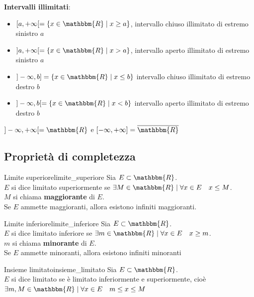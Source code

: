 \documentclass[12pt]{report}
\newcounter{definition}
\newcommand{\nmu}{}
\begin{document}
	\textbf{Intervalli illimitati}:
	\begin{itemize}
		\item $[a, +\infty[ = \{x \in \mathbbm{R} \mid x \geq a\}$, intervallo chiuso illimitato di estremo sinistro $a$
		\item $]a, +\infty[= \{x \in \mathbbm{R} \mid x > a\}$, intervallo aperto illimitato di estremo sinistro $a$
		\item $]-\infty, b] = \{x \in \mathbbm{R} \mid x \leq b\}$ intervallo chiuso illimitato di estremo destro $b$
		\item $]-\infty, b[ = \{x \in \mathbbm{R} \mid x < b\}$ intervallo aperto illimitato di estremo destro $b$
	\end{itemize}
	\begin{note}{}{}
		$]-\infty, +\infty[ = \mathbbm{R}$ e $[-\infty, +\infty] = \overline{\mathbbm{R}}$
	\end{note}
	\subsection{Proprietà di completezza}
	\begin{definition}{\nmu Limite superiore}{limite_superiore}
		Sia $E \subset \mathbbm{R}$. \\
		$E$ si dice limitato superiormente se $\exists M \in \mathbbm{R} \mid \forall x \in E \quad x \leq M$. \\
		$M$ si chiama \textbf{maggiorante} di $E$. \\
		Se $E$ ammette maggioranti, allora esistono infiniti maggioranti.
	\end{definition}
	\begin{definition}{\nmu Limite inferiore}{limite_inferiore}
		Sia $E \subset \mathbbm{R}$. \\
		$E$ si dice limitato inferiore se $\exists m \in \mathbbm{R} \mid \forall x \in E \quad x \geq m$. \\
		$m$ si chiama \textbf{minorante} di $E$. \\
		Se $E$ ammette minoranti, allora esistono infiniti minoranti
	\end{definition}
	\begin{definition}{\nmu Insieme limitato}{insieme_limitato}
		Sia $E \subset \mathbbm{R}$. \\
		$E$ si dice limitato se è limitato inferiormente e superiormente, cioè $\exists m, M \in \mathbbm{R} \mid \forall x \in E \quad m \leq x \leq M$
	\end{definition}
\end{document}

